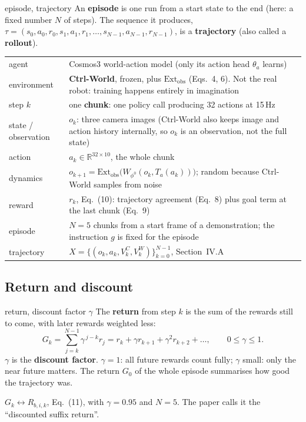 \documentclass[11pt,a4paper]{article}
\newcommand{\R}{\mathbb{R}}
\begin{document}
\begin{newc}{episode, trajectory}
An \textbf{episode} is one run from a start state to the end (here: a fixed number $N$ of steps). The sequence it produces, $\tau=(s_0,a_0,r_0,s_1,a_1,r_1,\dots,s_{N-1},a_{N-1},r_{N-1})$, is a \textbf{trajectory} (also called a \textbf{rollout}).
\end{newc}

\begin{paperlink}
\begin{tabular}{@{}l p{11.2cm}@{}}
agent & Cosmos3 world-action model (only its action head $\theta_a$ learns)\\
environment & \textbf{Ctrl-World}, frozen, plus $\mathrm{Ext}_{\mathrm{obs}}$ (Eqs.~4, 6). Not the real robot: training happens entirely in imagination\\
step $k$ & one \textbf{chunk}: one policy call producing 32 actions at 15\,Hz\\
state / observation & $o_k$: three camera images (Ctrl-World also keeps image and action history internally, so $o_k$ is an observation, not the full state)\\
action & $a_k\in\R^{32\times10}$, the whole chunk\\
dynamics & $o_{k+1}=\mathrm{Ext}_{\mathrm{obs}}\big(W_{\phi^0}(o_k,T_a(a_k))\big)$; random because Ctrl-World samples from noise\\
reward & $r_k$, Eq.~(10): trajectory agreement (Eq.~8) plus goal term at the last chunk (Eq.~9)\\
episode & $N=5$ chunks from a start frame of a demonstration; the instruction $g$ is fixed for the episode\\
trajectory & $X=\{(o_k,a_k,V^C_k,V^W_k)\}_{k=0}^{N-1}$, Section~IV.A\\
\end{tabular}
\end{paperlink}

\subsection{Return and discount}
\begin{newc}{return, discount factor $\gamma$}
The \textbf{return} from step $k$ is the sum of the rewards still to come, with later rewards weighted less:
\[G_k=\sum_{j=k}^{N-1}\gamma^{\,j-k}r_j=r_k+\gamma r_{k+1}+\gamma^2r_{k+2}+\dots,\qquad 0\le\gamma\le1.\]
$\gamma$ is the \textbf{discount factor}. $\gamma=1$: all future rewards count fully; $\gamma$ small: only the near future matters. The return $G_0$ of the whole episode summarises how good the trajectory was.
\end{newc}
\begin{paperlink}
$G_k\leftrightarrow R_{b,i,k}$, Eq.~(11), with $\gamma=0.95$ and $N=5$. The paper calls it the ``discounted suffix return''.
\end{paperlink}
\end{document}

